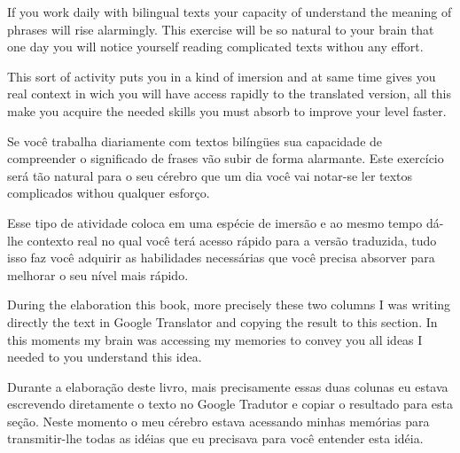 \begin{multicols}{2}

\noindent
If you work daily with bilingual texts your capacity of understand the
meaning of phrases will rise alarmingly. This exercise will be so
natural to your brain that one day you will notice yourself reading
complicated texts withou any effort.

\noindent
This sort of activity puts you
in a kind of imersion and at same time gives you real context in wich
you will have access rapidly to the translated version, all this make
you acquire the needed skills you must absorb to improve your level faster.

\columnbreak

\noindent
Se você trabalha diariamente com textos bilíngües sua capacidade de
compreender o significado de frases vão subir de forma alarmante. Este
exercício será tão natural para o seu cérebro que um dia você vai
notar-se ler textos complicados withou qualquer esforço.

\vspace{0.5cm}
\noindent
Esse tipo de atividade coloca em uma espécie de imersão e ao mesmo tempo dá-lhe
contexto real no qual você terá acesso rápido para a versão traduzida,
tudo isso faz você adquirir as habilidades necessárias que você
precisa absorver para melhorar o seu nível mais rápido.

\end{multicols}

\pagebreak

\begin{multicols}{2}

During the elaboration this book, more precisely these two columns I
was writing directly the text in Google Translator and copying the
result to this section. In this moments my brain was accessing my
memories to convey you all ideas I needed to you understand this idea.

\vfill \columnbreak

Durante a elaboração deste livro, mais precisamente essas duas colunas eu estava escrevendo
diretamente o texto no Google Tradutor e copiar o resultado para esta
seção. Neste momento o meu cérebro estava acessando minhas memórias
para transmitir-lhe todas as idéias que eu precisava para você
entender esta idéia.

\end{multicols}



